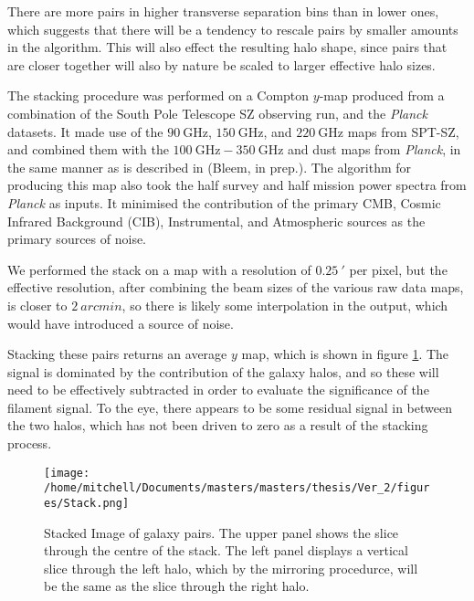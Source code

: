 \par There are more pairs in higher transverse separation bins than in lower ones, which suggests that there will be a tendency to rescale pairs by smaller amounts in the algorithm. This will also effect the resulting halo shape, since pairs that are closer together will also by nature be scaled to larger effective halo sizes.  

The stacking procedure was performed on a Compton $y$-map produced from a combination of the South Pole Telescope SZ observing run, and the \emph{Planck} datasets. It made use of the $\SI{90}{\giga\hertz}$, $\SI{150}{\giga\hertz}$, and $\SI{220}{\giga\hertz}$ maps from SPT-SZ, and combined them with the $\SI{100}{\giga\hertz} - \SI{350}{\giga\hertz}$ and dust maps from \emph{Planck}, in the same manner as is described in \cite{2016ApJS..227...23C} (Bleem, in prep.). The algorithm for producing this map also took the half survey and half mission power spectra from \emph{Planck} as inputs. It minimised the contribution of the primary CMB, Cosmic Infrared Background (CIB), Instrumental, and Atmospheric sources as the primary sources of noise. 

We performed the stack on a map with a resolution of $\SI{0.25}{\arcmin}$ per pixel, but the effective resolution, after combining the beam sizes of the various raw data maps, is closer to $\SI{2}{arcmin}$, so there is likely some interpolation in the output, which would have introduced a source of noise.


Stacking these pairs returns an average $y$ map, which is shown in figure \ref{fig:physical:stack}. The signal is dominated by the contribution of the galaxy halos, and so these will need to be effectively subtracted in order to evaluate the significance of the filament signal. To the eye, there appears to be some residual signal in between the two halos, which has not been driven to zero as a result of the stacking process. 


\begin{figure}[h!]
\centering
\texttt{[image: /home/mitchell/Documents/masters/masters/thesis/Ver\_2/figures/Stack.png]}
\caption{Stacked Image of galaxy pairs. The upper panel shows the slice through the centre of the stack. The left panel displays a vertical slice through the left halo, which by the mirroring procedurce, will be the same as the slice through the right halo.}
\label{fig:physical:stack}
\end{figure}

